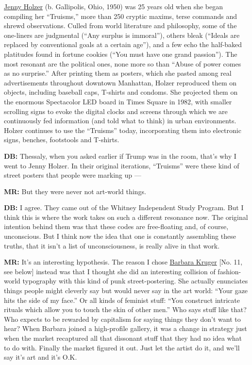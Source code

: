 \href{https://www.nytimes.com/2016/06/21/t-magazine/art/jenny-holzer-ibiza.html}{Jenny
Holzer} (b. Gallipolis, Ohio, 1950) was 25 years old when she began
compiling her ``Truisms,'' more than 250 cryptic maxims, terse commands
and shrewd observations. Culled from world literature and philosophy,
some of the one-liners are judgmental (``Any surplus is immoral''),
others bleak (``Ideals are replaced by conventional goals at a certain
age''), and a few echo the half-baked platitudes found in fortune
cookies (``You must have one grand passion''). The most resonant are the
political ones, none more so than ``Abuse of power comes as no
surprise.'' After printing them as posters, which she pasted among real
advertisements throughout downtown Manhattan, Holzer reproduced them on
objects, including baseball caps, T-shirts and condoms. She projected
them on the enormous Spectacolor LED board in Times Square in 1982, with
smaller scrolling signs to evoke the digital clocks and screens through
which we are continuously fed information (and told what to think) in
urban environments. Holzer continues to use the ``Truisms'' today,
incorporating them into electronic signs, benches, footstools and
T-shirts.

\textbf{DB:} Thessaly, when you asked earlier if Trump was in the room,
that's why I went to Jenny Holzer. In their original iterations,
``Truisms'' were these kind of street posters that people were marking
up ---

\textbf{MR:} But they were never not art-world things.

\textbf{DB:} I agree. They came out of the Whitney Independent Study
Program. But I think this is where the work takes on such a different
resonance now. The original intention behind them was that these codes
are free-floating and, of course, unconscious. But I think now the idea
that one is constantly assembling these truths, that it isn't a list of
unconsciousness, is really alive in that work.

\textbf{MR:} It's an interesting hypothesis. The reason I chose
\href{https://www.nytimes.com/2017/10/29/arts/barbara-kruger-designed-metrocards-are-coming-to-new-york-city.html}{Barbara
Kruger} {[}No. 11, see below{]} instead was that I thought she did an
interesting collision of fashion-world typography with this kind of punk
street-postering. She actually enunciates things people might cleverly
say but would never say in the art world: ``Your gaze hits the side of
my face.'' Or all kinds of feminist stuff: ``You construct intricate
rituals which allow you to touch the skin of other men.'' Who says stuff
like that? Who expects to be rewarded by capitalism for saying things
they don't want to hear? When Barbara joined a high-profile gallery, it
was a change in strategy just when the market recaptured all that
dissonant stuff that they had no idea what to do with. Finally the
market figured it out. Just let the artist do it, and we'll say it's art
and it's O.K.

